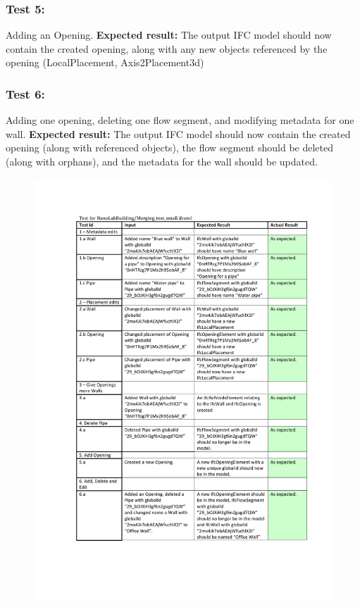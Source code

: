 \subsubsection{Test 5:}
Adding an Opening.\newline
\textbf{Expected result:} The output IFC model should now contain the created opening, along with any new objects referenced by the opening (LocalPlacement, Axis2Placement3d)
\subsubsection{Test 6:}
Adding one opening, deleting one flow segment, and modifying metadata for one wall.\newline
\textbf{Expected result:} The output IFC model should now contain the created opening (along with referenced objects), the flow segment should be deleted (along with orphans), and the metadata for the wall should be updated.
\begin{figure}
    \centering
        \centerline{\includegraphics[width=150mm]{images/Test1.pdf}}
    \caption{}
    \label{fig:test1}
\end{figure}
